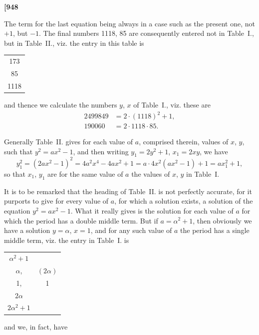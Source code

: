 \documentclass[11pt,a4paper]{book}
\begin{document}
{{{\newpage
\noindent\textbf{[948}

The term for the last equation being always in a case such as the present one, not $+1$, but $-1$. The final numbers 1118, 85 are consequently entered not in Table~I., but in Table~II., viz. the entry in this table is
\begin{center}
\begin{tabular}{c}
173 \\
85 \\
1118
\end{tabular}
\end{center}
and thence we calculate the numbers $y$, $x$ of Table~I., viz. these are
\[
\begin{aligned}
2499849 &= 2 \cdot (1118)^{2} + 1, \\
190060 &= 2 \cdot 1118 \cdot 85.
\end{aligned}
\]

Generally Table~II. gives for each value of $a$, comprised therein, values of $x$, $y$, such that $y^{2} = ax^{2} - 1$, and then writing $y_{1} = 2y^{2} + 1$, $x_{1} = 2xy$, we have
\[
y_{1}^{2} = (2ax^{2} - 1)^{2} = 4a^{2}x^{4} - 4ax^{2} + 1 = a \cdot 4x^{2}(ax^{2} - 1) + 1 = ax_{1}^{2} + 1,
\]
so that $x_{1}$, $y_{1}$ are for the same value of $a$ the values of $x$, $y$ in Table~I.

It is to be remarked that the heading of Table~II. is not perfectly accurate, for it purports to give for every value of $a$, for which a solution exists, a solution of the equation $y^{2} = ax^{2} - 1$. What it really gives is the solution for each value of $a$ for which the period has a double middle term. But if $a = \alpha^{2} + 1$, then obviously we have a solution $y = \alpha$, $x = 1$, and for any such value of $a$ the period has a single middle term, viz. the entry in Table~I. is

\begin{center}
\begin{tabular}{cc}
$\alpha^{2}+1$ & \\
$\alpha$, & $(2\alpha)$ \\
1, & 1 \\
$2\alpha$ & \\
$2\alpha^{2}+1$ &
\end{tabular}
\end{center}

and we, in fact, have

}}}
\end{document}

